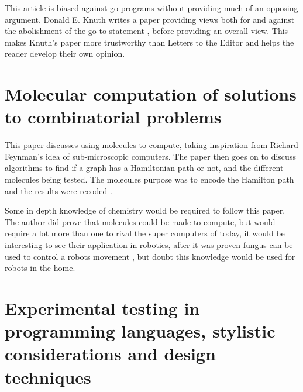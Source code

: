 \documentclass{scrartcl}
\begin{document}
This article is biased against go programs without providing much of an opposing argument. Donald E. Knuth writes a paper providing views both for and against the abolishment of the go to statement \cite{knuth1974structured}, before providing an overall view. This makes Knuth’s paper more trustworthy than Letters to the Editor and helps the reader develop their own opinion.

\section{Molecular computation of solutions to combinatorial problems}

This paper discusses using molecules to compute, taking inspiration from Richard Feynman’s idea of sub-microscopic computers.  The paper then goes on to discuss algorithms to find if a graph has a Hamiltonian path or not, and the different molecules being tested. The molecules purpose was to encode the Hamilton path and the results were recoded \cite{adleman1994molecular}.

Some in depth knowledge of chemistry would be required to follow this paper. The author did prove that molecules could be made to compute, but would require a lot more than one to rival the super computers of today, it would be interesting to see their application in robotics, after it was proven fungus can be used to control a robots movement \cite{schwarz2013development}, but doubt this knowledge would be used for robots in the home.

\section{Experimental testing in programming languages, stylistic considerations and design techniques}

\cite{shneiderman1975experimental}



\end{document}
